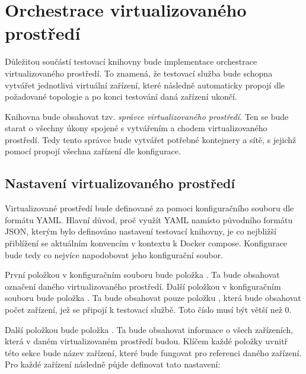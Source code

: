 \clearpage

\section{Orchestrace virtualizovaného prostředí}

Důležitou součástí testovací knihovny bude implementace orchestrace virtualizovaného prostředí. To znamená, že testovací služba bude schopna vytvářet jednotlivá virtuální zařízení, které následně automaticky propojí dle požadované topologie a po konci testování daná zařízení ukončí. 

Knihovna bude obsahovat tzv. \textit{správce virtualizovaného prostředí}. Ten se bude starat o všechny úkony spojené s vytvářením a chodem virtualizovaného prostředí. Tedy tento správce bude vytvářet potřebné kontejnery a sítě, s jejichž pomocí propojí všechna zařízení dle konfigurace. 

\subsection{Nastavení virtualizovaného prostředí}\label{sec:env_conf}

Virtualizované prostředí bude definované za pomoci konfiguračního souboru dle formátu YAML. Hlavní důvod, proč využít YAML namísto původního formátu JSON, kterým bylo definováno nastavení testovací knihovny, je co nejbližší přiblížení se aktuálním konvencím v kontextu k Docker compose. Konfigurace bude tedy co nejvíce napodobovat jeho konfigurační soubor. 

První položkou v konfiguračním souboru bude položka . Ta bude obsahovat označení daného virtualizovaného prostředí. Další položkou v konfiguračním souboru bude položka . Ta bude obsahovat pouze položku , která bude obsahovat počet zařízení, jež se připojí k testovací službě. Toto číslo musí být větší než 0.

Další položkou bude položka . Ta bude obsahovat informace o všech zařízeních, která v daném virtualizovaném prostředí budou. Klíčem každé položky uvnitř této sekce bude název zařízení, které bude fungovat pro referenci daného zařízení. Pro každé zařízení následně půjde definovat tato nastavení: 

